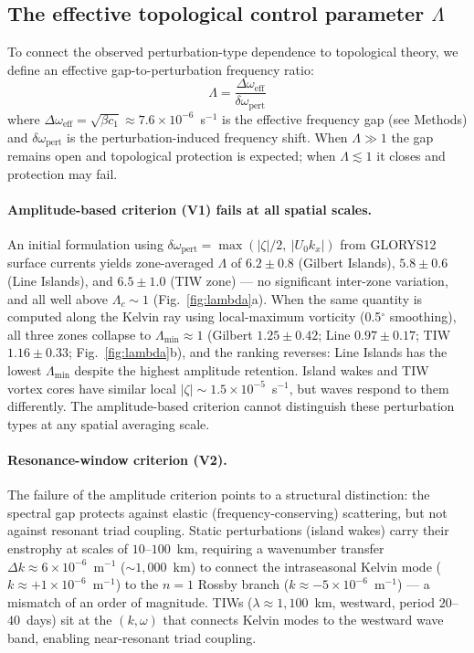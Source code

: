 \documentclass[11pt]{article}
\begin{document}
\subsection{The effective topological control parameter $\Lambda$}

To connect the observed perturbation-type dependence to topological theory, we define an effective gap-to-perturbation frequency ratio:
\begin{equation}
\Lambda = \frac{\Delta\omega_\mathrm{eff}}{\delta\omega_\mathrm{pert}}
\label{eq:lambda}
\end{equation}
where $\Delta\omega_\mathrm{eff} = \sqrt{\beta c_1} \approx 7.6 \times 10^{-6}$~s$^{-1}$ is the effective frequency gap (see Methods) and $\delta\omega_\mathrm{pert}$ is the perturbation-induced frequency shift. When $\Lambda \gg 1$ the gap remains open and topological protection is expected; when $\Lambda \lesssim 1$ it closes and protection may fail.

\paragraph{Amplitude-based criterion (V1) fails at all spatial scales.}
An initial formulation using $\delta\omega_\mathrm{pert} = \max(|\zeta|/2,\ |U_0 k_x|)$ from GLORYS12 surface currents yields zone-averaged $\Lambda$ of $6.2 \pm 0.8$ (Gilbert Islands), $5.8 \pm 0.6$ (Line Islands), and $6.5 \pm 1.0$ (TIW zone) --- no significant inter-zone variation, and all well above $\Lambda_c \sim 1$ (Fig.~\ref{fig:lambda}a). When the same quantity is computed along the Kelvin ray using local-maximum vorticity (0.5$^\circ$ smoothing), all three zones collapse to $\Lambda_\mathrm{min} \approx 1$ (Gilbert $1.25 \pm 0.42$; Line $0.97 \pm 0.17$; TIW $1.16 \pm 0.33$; Fig.~\ref{fig:lambda}b), and the ranking reverses: Line Islands has the lowest $\Lambda_\mathrm{min}$ despite the highest amplitude retention. Island wakes and TIW vortex cores have similar local $|\zeta| \sim 1.5 \times 10^{-5}$~s$^{-1}$, but waves respond to them differently. The amplitude-based criterion cannot distinguish these perturbation types at any spatial averaging scale.

\paragraph{Resonance-window criterion (V2).}
The failure of the amplitude criterion points to a structural distinction: the spectral gap protects against elastic (frequency-conserving) scattering, but not against resonant triad coupling. Static perturbations (island wakes) carry their enstrophy at scales of $10$--$100$~km, requiring a wavenumber transfer $\Delta k \approx 6 \times 10^{-6}$~m$^{-1}$ (${\sim}1{,}000$~km) to connect the intraseasonal Kelvin mode ($k \approx +1 \times 10^{-6}$~m$^{-1}$) to the $n = 1$ Rossby branch ($k \approx -5 \times 10^{-6}$~m$^{-1}$) --- a mismatch of an order of magnitude. TIWs ($\lambda \approx 1{,}100$~km, westward, period $20$--$40$~days\cite{KennanFlament2000}) sit at the $(k, \omega)$ that connects Kelvin modes to the westward wave band, enabling near-resonant triad coupling\cite{Lyman2005}.
\end{document}
